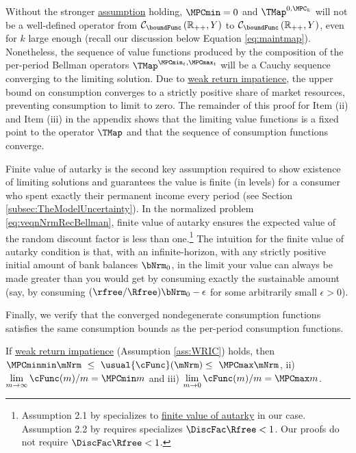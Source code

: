 \documentclass[BufferStockTheory]{subfiles}
\begin{document}
Without the stronger \hyperlink{return impatience}{assumption} holding, $\MPCmin = 0$ and $\TMap^{0, \MPC_{k}}$ will not be a well-defined operator from  $\mathcal{C}_{\boundFunc }\left(\mathbb{R}_{++},Y\right)$ to $\mathcal{C}_{\boundFunc }\left(\mathbb{R}_{++},Y\right)$, even for $k$ large enough (recall our discussion below Equation \eqref{eq:maintmap}). Nonetheless, the sequence of value functions produced by the composition of the per-period Bellman operators $\TMap^{\MPCmin_{t}, \MPCmax_{t}}$  will be a Cauchy sequence converging to the limiting solution. Due to \hyperlink{WRIC}{weak return impatience}, the upper bound on consumption converges to a strictly positive share of market resources, preventing consumption to limit to zero. The  remainder of this proof for Item (ii) and Item (iii) in the appendix shows that the limiting value functions is a fixed point to the operator $\TMap$ and that the sequence of consumption functions converge. 


Finite value of autarky is the second key assumption required to show existence of limiting solutions and guarantees the value is finite (in levels) for a consumer who spent exactly their permanent income every period (see Section \ref{subsec:TheModelUncertainty}). In the normalized problem \eqref{eq:veqnNrmRecBellman}, finite value of autarky ensures the expected value of the random discount factor is less than one.\footnote{Assumption 2.1 by \cite{mstIncFluct} specializes to \hyperlink{FVAC}{finite value of autarky} in our case. Assumption 2.2 by \cite{mstIncFluct} requires specializes $\DiscFac\Rfree<1$. Our proofs do not require $\DiscFac\Rfree<1$.} The intuition for the finite value of autarky condition is that, with an infinite-horizon, with any strictly positive initial amount of bank balances $\bNrm_{0}$, in the limit your value can always be made greater than you would get by consuming exactly the sustainable amount (say, by consuming $(\rfree/\Rfree)\bNrm_{0}-\epsilon$ for some arbitrarily small $\epsilon>0$).


Finally, we verify that the converged nondegenerate consumption functions satisfies the same consumption bounds as the per-period consumption functions.

\begin{claim}\label{lemm:MPC}
If \hyperlink{WRIC}{weak return impatience} (Assumption \ref{ass:WRIC}) holds, then $\MPCminmin  \mNrm ~ \leq  ~  \usual{\cFunc}(\mNrm)  \leq  ~ \MPCmax \mNrm$, ii) $\lim\limits_{m\rightarrow \infty} \cFunc (m)/m =\MPCmin m$ and iii) $\lim\limits_{m\rightarrow 0} \cFunc (m)/m =\MPCmax m$.  
\end{claim}
\end{document}
